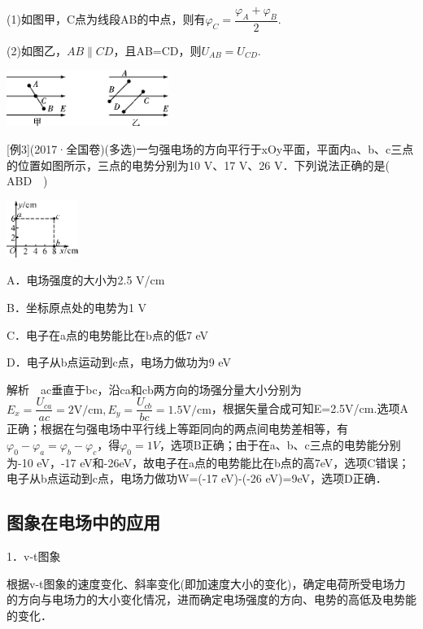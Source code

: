 (1)如图甲，C点为线段AB的中点，则有$\varphi_{C}=\dfrac{\varphi_{A}+\varphi_{B}}{2}$.

(2)如图乙，$A B \| C D$，且AB=CD，则$U_{A B}=U_{C D}$.

\begin{center}\includegraphics[width=2.07292in,height=0.71875in]{media/image282.png}\end{center}
{[}例3{]}(2017·全国卷\uppercase\expandafter{})(多选)一匀强电场的方向平行于xOy平面，平面内a、b、c三点的位置如图所示，三点的电势分别为10
V、17 V、26 V．下列说法正确的是(　ABD　)

\begin{center}\includegraphics[width=0.91667in,height=0.72917in]{media/image283.png}\end{center}

A．电场强度的大小为2.5 V/cm

B．坐标原点处的电势为1 V

C．电子在a点的电势能比在b点的低7 eV

D．电子从b点运动到c点，电场力做功为9 eV

解析　ac垂直于bc，沿ca和cb两方向的场强分量大小分别为$E_{x}=\dfrac{U_{c a}}{a c}=2 \mathrm{V} / \mathrm{cm}, E_{y}=\dfrac{U_{c b}}{b c}=1.5 \mathrm{V} / \mathrm{cm}$，根据矢量合成可知E=2.5V/cm.选项A正确；根据在匀强电场中平行线上等距同向的两点间电势差相等，有$\varphi_{0}-\varphi_{a}=\varphi_{b}-\varphi_{c}$，得$\varphi_{0}=1V$，选项B正确；由于在a、b、c三点的电势能分别为-10 eV，-17 eV和-26eV，故电子在a点的电势能比在b点的高7eV，选项C错误；电子从b点运动到c点，电场力做功W=(-17 eV)-(-26 eV)=9eV，选项D正确．

\subsection{图象在电场中的应用}

1．v-t图象

根据v-t图象的速度变化、斜率变化(即加速度大小的变化)，确定电荷所受电场力的方向与电场力的大小变化情况，进而确定电场强度的方向、电势的高低及电势能的变化．


